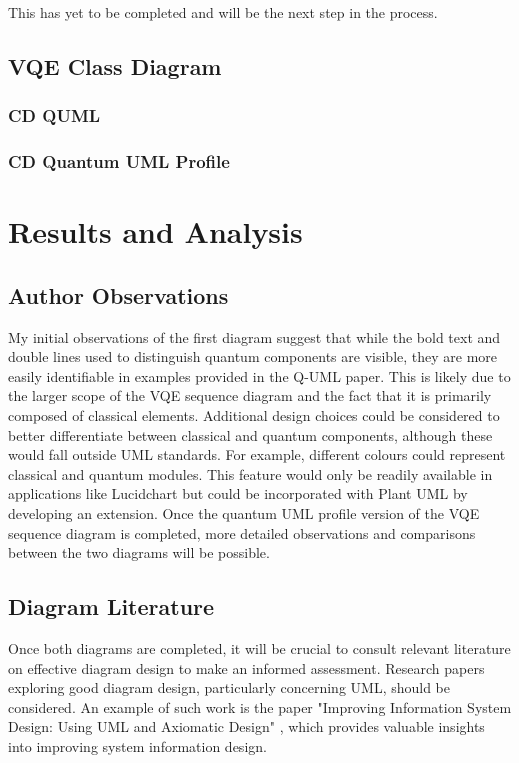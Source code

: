 \documentclass{article}
\begin{document}
This has yet to be completed and will be the next step in the process.

\subsection{VQE Class Diagram}
\subsubsection{CD QUML}
\subsubsection{CD Quantum UML Profile}

\section{Results and Analysis}

\subsection{Author Observations}

My initial observations of the first diagram suggest that while the bold text and double lines used to distinguish quantum components are visible, they are more easily identifiable in examples provided in the Q-UML paper. This is likely due to the larger scope of the VQE sequence diagram and the fact that it is primarily composed of classical elements.
Additional design choices could be considered to better differentiate between classical and quantum components, although these would fall outside UML standards. For example, different colours could represent classical and quantum modules. This feature would only be readily available in applications like Lucidchart but could be incorporated with Plant UML by developing an extension.
Once the quantum UML profile version of the VQE sequence diagram is completed, more detailed observations and comparisons between the two diagrams will be possible.

\subsection{Diagram Literature}

Once both diagrams are completed, it will be crucial to consult relevant literature on effective diagram design to make an informed assessment. Research papers exploring good diagram design, particularly concerning UML, should be considered. An example of such work is the paper "Improving Information System Design: Using UML and Axiomatic Design" \cite{CAVIQUE2022103569}, which provides valuable insights into improving system information design.
\end{document}
